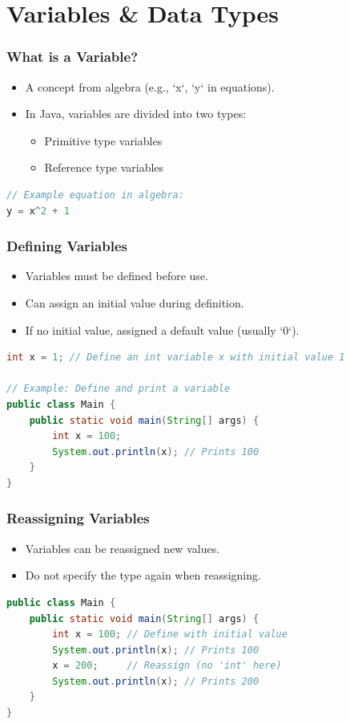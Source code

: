 \documentclass[serif, aspectratio=169]{beamer}
\begin{document}
\section{Variables \& Data Types}
\begin{frame}[fragile]
\frametitle{What is a Variable?}
\begin{itemize}
    \item A concept from algebra (e.g., `x`, `y` in equations).
    \item In Java, variables are divided into two types:
    \begin{itemize}
        \item Primitive type variables
        \item Reference type variables
    \end{itemize}
\end{itemize}
\begin{lstlisting}[language=Java]
// Example equation in algebra:
y = x^2 + 1
\end{lstlisting}
\end{frame}

\begin{frame}[fragile]
\frametitle{Defining Variables}
\begin{itemize}
    \item Variables must be defined before use.
    \item Can assign an initial value during definition.
    \item If no initial value, assigned a default value (usually `0`).
\end{itemize}
\begin{lstlisting}[language=Java]
int x = 1; // Define an int variable x with initial value 1

// Example: Define and print a variable
public class Main {
    public static void main(String[] args) {
        int x = 100;
        System.out.println(x); // Prints 100
    }
}
\end{lstlisting}
\end{frame}

\begin{frame}[fragile]
\frametitle{Reassigning Variables}
\begin{itemize}
    \item Variables can be reassigned new values.
    \item Do not specify the type again when reassigning.
\end{itemize}
\begin{lstlisting}[language=Java]
public class Main {
    public static void main(String[] args) {
        int x = 100; // Define with initial value
        System.out.println(x); // Prints 100
        x = 200;     // Reassign (no 'int' here)
        System.out.println(x); // Prints 200
    }
}
\end{lstlisting}
\end{frame}
\end{document}
